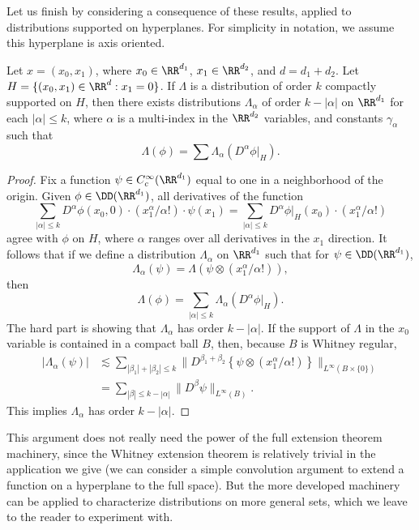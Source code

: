 Let us finish by considering a consequence of these results, applied to distributions supported on hyperplanes. For simplicity in notation, we assume this hyperplane is axis oriented.

\begin{theorem}
    Let $x = (x_0,x_1)$, where $x_0 \in \RR^{d_1}$, $x_1 \in \RR^{d_2}$, and $d = d_1 + d_2$. Let $H = \{ (x_0,x_1) \in \RR^d: x_1 = 0 \}$. If $\Lambda$ is a distribution of order $k$ compactly supported on $H$, then there exists distributions $\Lambda_\alpha$ of order $k - |\alpha|$ on $\RR^{d_1}$ for each $|\alpha| \leq k$, where $\alpha$ is a multi-index in the $\RR^{d_2}$ variables, and constants $\gamma_\alpha$ such that
    \[ \Lambda(\phi) = \sum \Lambda_\alpha(D^\alpha \phi |_H). \]
\end{theorem}
\begin{proof}
    Fix a function $\psi \in C_c^\infty(\RR^{d_1})$ equal to one in a neighborhood of the origin. Given $\phi \in \DD(\RR^{d_1})$, all derivatives of the function
    \[ \sum_{|\alpha| \leq k} D^\alpha \phi(x_0,0) \cdot (x_1^\alpha / \alpha!) \cdot \psi(x_1) = \sum_{|\alpha| \leq k} D^\alpha \phi |_H (x_0) \cdot (x_1^\alpha / \alpha!) \]
    agree with $\phi$ on $H$, where $\alpha$ ranges over all derivatives in the $x_1$ direction. It follows that if we define a distribution $\Lambda_\alpha$ on $\RR^{d_1}$ such that for $\psi \in \DD(\RR^{d_1})$,
    \[ \Lambda_\alpha(\psi) = \Lambda( \psi \otimes (x_1^\alpha / \alpha!)), \]
    then
    \[ \Lambda(\phi) = \sum_{|\alpha| \leq k} \Lambda_\alpha( D^\alpha \phi |_H ). \]
    The hard part is showing that $\Lambda_\alpha$ has order $k - |\alpha|$. If the support of $\Lambda$ in the $x_0$ variable is contained in a compact ball $B$, then, because $B$ is Whitney regular,
    \begin{align*}
        |\Lambda_\alpha(\psi)| &\lesssim \sum_{|\beta_1| + |\beta_2| \leq k} \| D^{\beta_1 + \beta_2} \left\{ \psi \otimes (x_1^\alpha / \alpha!) \right\} \|_{L^\infty(B \times \{ 0 \})}\\
        &= \sum_{|\beta| \leq k - |\alpha|} \| D^\beta \psi \|_{L^\infty(B)}.
    \end{align*}
    This implies $\Lambda_\alpha$ has order $k-|\alpha|$.
\end{proof}

\begin{remark}
    This argument does not really need the power of the full extension theorem machinery, since the Whitney extension theorem is relatively trivial in the application we give (we can consider a simple convolution argument to extend a function on a hyperplane to the full space). But the more developed machinery can be applied to characterize distributions on more general sets, which we leave to the reader to experiment with.
\end{remark}

